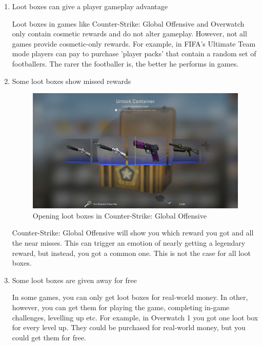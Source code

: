 \documentclass[10pt,oneside,english,a4paper]{article}
\begin{document}
\begin{enumerate}

\item Loot boxes can give a player gameplay advantage

	Loot boxes in games like Counter-Strike: Global Offensive and Overwatch only contain cosmetic rewards and do not alter gameplay. However, not all games provide cosmetic-only rewards. For example, in FIFA's Ultimate Team mode players can pay to purchase 'player packs' that contain a random set of footballers. The rarer the footballer is, the better he performs in games.\cite{fifa:lootboxes}

\item Some loot boxes show missed rewards
	
\begin{figure}
	\centering
	\includegraphics[width=\columnwidth]{img2}
	\caption{Opening loot boxes in Counter-Strike: Global Offensive}
	\label{fig:img2}
\end{figure}
	
	Counter-Strike: Global Offensive will show you which reward you got and all the near misses. This can trigger an emotion of nearly getting a legendary reward, but instead, you got a common one. This is not the case for all loot boxes.

\item Some loot boxes are given away for free

	In some games, you can only get loot boxes for real-world money. In other, however, you can get them for playing the game, completing in-game challenges, levelling up etc. For example, in Overwatch 1 you got one loot box for every level up. They could be purchased for real-world money, but you could get them for free. 


\end{enumerate}
\end{document}
